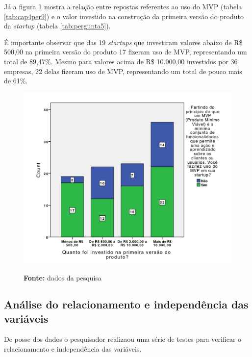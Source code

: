 \pagebreak

J\'a a figura \ref{fig:cap4fig2} mostra a rela\c{c}\~ao entre repostas referentes ao uso do MVP (tabela \ref{tab:cap4per9}) e o valor investido na constru\c{c}\~ao da primeira vers\~ao do produto da \emph{startup} (tabela \ref{tab:pergunta5}). 

\'E importante observar que das 19 \emph{startups} que investiram valores abaixo de R\$ 500,00 na primeira vers\~ao do produto 17 fizeram uso de MVP, representando um total de 89,47\%. Mesmo para valores acima de R\$ 10.000,00 investidos por 36 empresas, 22 delas fizeram uso de MVP, representando um total de pouco mais de 61\%.

\begin{figure}[h]
  \centering
  \caption{Rela\c{c}\~ao entre \emph{startups} que usam MVP e o montante investido na constru\c{c}\~ao do produto.}
  \includegraphics[width=1.1\textwidth]{./fig/graph2}
  \label{fig:cap4fig2}
  \caption*{\textbf{Fonte:} dados da pesquisa}
\end{figure}

\pagebreak

\subsection{An\'alise do relacionamento e independ\^encia das vari\'aveis}

De posse dos dados o pesquisador realizaou uma s\'erie de testes para verificar o relacionamento e independ\^encia das vari\'aveis.

